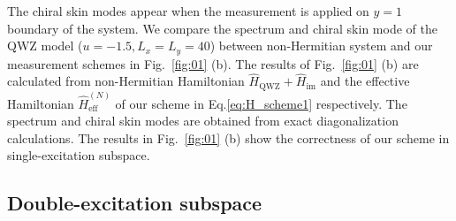 \documentclass[longbibliography, aps, prx, amsmath, amssymb, amsfonts, twocolumn,superscriptaddress, footinbib]{revtex4-1}
\begin{document}
	The chiral skin modes appear when the measurement is applied on $y=1$ boundary of the system. We compare the spectrum and chiral skin mode of the QWZ model ($u=-1.5, L_x=L_y=40$) between non-Hermitian system and our measurement schemes in Fig.~\ref{fig:01} (b). The results of Fig.~\ref{fig:01} (b) are calculated from non-Hermitian Hamiltonian $\hat{H}_{\text{QWZ}} + \hat{H}_{\text{im}}$ and the effective Hamiltonian $\hat{H}_{\text{eff}}^{(N)}$ of our scheme in Eq.\ref{eq:H_scheme1} respectively. 
	The spectrum and chiral skin modes are obtained from exact diagonalization calculations. The results in Fig.~\ref{fig:01} (b) show the correctness of our scheme in single-excitation subspace.



	\subsection{Double-excitation subspace}

\end{document}
